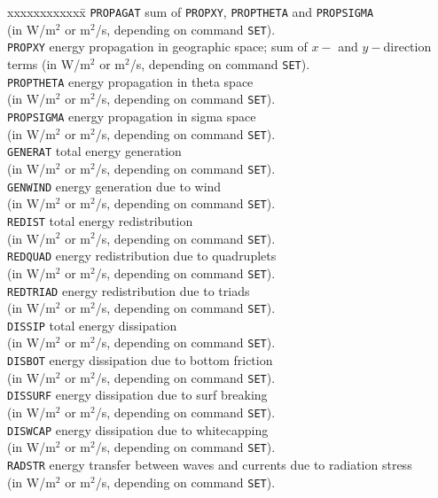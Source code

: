 \documentclass[12pt]{book}
\begin{document}
\begin{tabbing}
 xxxxxxxxxxxx\= \kill
{\tt PROPAGAT} \> sum of {\tt PROPXY}, {\tt PROPTHETA} and {\tt PROPSIGMA}\+\\
                (in W/m$^2$ or m$^2$/s, depending on command {\tt SET}).\-\\
{\tt PROPXY} \> energy propagation in geographic space; sum of $x-$ and $y-$direction\+\\
                terms (in W/m$^2$ or m$^2$/s, depending on command {\tt SET}).\-\\
{\tt PROPTHETA} \> energy propagation in theta space\+\\
                (in W/m$^2$ or m$^2$/s, depending on command {\tt SET}).\-\\
{\tt PROPSIGMA} \> energy propagation in sigma space\+\\
                (in W/m$^2$ or m$^2$/s, depending on command {\tt SET}).\-\\
{\tt GENERAT} \> total energy generation\+\\
                (in W/m$^2$ or m$^2$/s, depending on command {\tt SET}).\-\\
{\tt GENWIND} \> energy generation due to wind\+\\
                (in W/m$^2$ or m$^2$/s, depending on command {\tt SET}).\-\\
{\tt REDIST} \> total energy redistribution\+\\
                (in W/m$^2$ or m$^2$/s, depending on command {\tt SET}).\-\\
{\tt REDQUAD} \> energy redistribution due to quadruplets\+\\
                (in W/m$^2$ or m$^2$/s, depending on command {\tt SET}).\-\\
{\tt REDTRIAD} \> energy redistribution due to triads\+\\
                (in W/m$^2$ or m$^2$/s, depending on command {\tt SET}).\-\\
{\tt DISSIP} \> total energy dissipation\+\\
                (in W/m$^2$ or m$^2$/s, depending on command {\tt SET}).\-\\
{\tt DISBOT} \> energy dissipation due to bottom friction\+\\
                (in W/m$^2$ or m$^2$/s, depending on command {\tt SET}).\-\\
{\tt DISSURF} \> energy dissipation due to surf breaking\+\\
                (in W/m$^2$ or m$^2$/s, depending on command {\tt SET}).\-\\
{\tt DISWCAP} \> energy dissipation due to whitecapping\+\\
                (in W/m$^2$ or m$^2$/s, depending on command {\tt SET}).\-\\
{\tt RADSTR} \> energy transfer between waves and currents due to radiation stress\+\\
                (in W/m$^2$ or m$^2$/s, depending on command {\tt SET}).\-\\
\end{tabbing}
\end{document}
